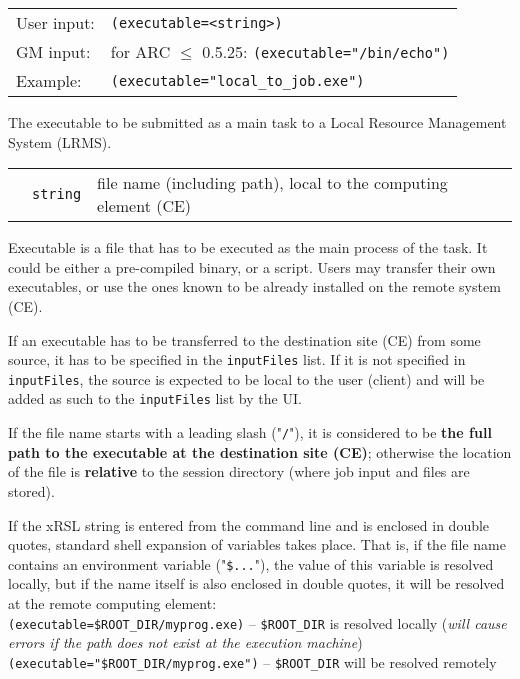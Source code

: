   \hspace*{0.5cm}
  \begin{shaded}
  \end{shaded}
  \begin{tabular}{lp{13cm}}
    User input:&\verb#(executable=<string>)#\\
    GM input:& for ARC $\leq$ 0.5.25:  \verb#(executable="/bin/echo")#\\
    Example:&\verb#(executable="local_to_job.exe")#\\
  \end{tabular}

  The executable to be submitted as a main task to a Local Resource
  Management System (LRMS).

  \begin{tabular}{llp{10cm}}
    \hspace*{1cm}&\texttt{string}&file name (including path), local to the computing
    element (CE)\\
  \end{tabular}

  Executable is a file that has to be executed as the main process
  of the task. It could be either a pre-compiled binary, or a
  script. Users may transfer their own executables, or use the ones
  known to be already installed on the remote system (CE).

  If an executable has to be transferred to the destination site (CE) from some source, it
  has to be specified in the \texttt{inputFiles} list. If it is not specified in \texttt{inputFiles},
  the source is expected to be local to the user (client) and
  will be added as such to the \texttt{inputFiles} list by the UI.

  If the file name starts with a leading slash ("\verb#/#"), it is considered
  to be \textbf{the full path to the executable at the destination site (CE)}; otherwise
  the location of the file is \textbf{relative} to the session
  directory (where job input and files are stored). 

  If the xRSL string is entered from the command line and is enclosed
  in double quotes, standard shell expansion of variables takes place.
  That is, if the file name
  contains an environment variable ("\verb#$...#"), %
  the value of this variable is resolved locally, but if the name
  itself is also
  enclosed in double quotes, it will be resolved at the remote
  computing element:\\
  \verb#(executable=$ROOT_DIR/myprog.exe)# -- \verb#$ROOT_DIR# is resolved
  locally (\textit{will cause errors if the path does not exist at the
  execution machine})\\
  \verb#(executable="$ROOT_DIR/myprog.exe")# -- \verb#$ROOT_DIR# will be
  resolved remotely\\

